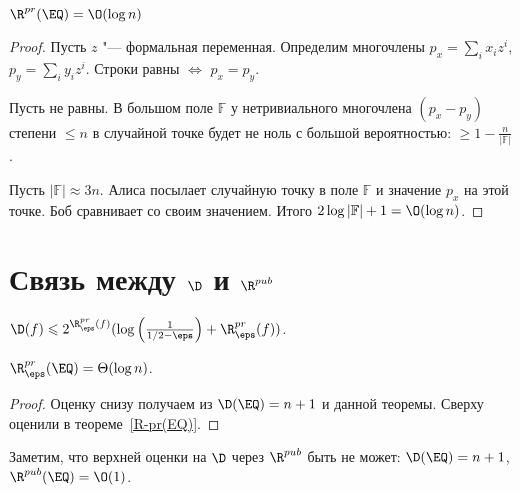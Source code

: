 \begin{theorem}
\label{R-pr(EQ)}
$\R^{pr}(\EQ) = \O(\log n)$
\end{theorem}
\begin{proof}
Пусть $z$ "--- формальная переменная.
Определим многочлены $p_x = \sum_i x_i z^i$, $p_y = \sum_i y_i z^i$. Строки равны $\iff$ $p_x = p_y$.

Пусть не равны. В большом поле $\mathbb{F}$ у нетривиального многочлена $(p_x-p_y)$ степени $\leqslant n$ в случайной точке будет не ноль с большой вероятностью: $\ge 1-\frac{n}{|\mathbb{F}|}$.

Пусть $|\mathbb{F}| \approx 3n$. Алиса посылает случайную точку в поле $\mathbb{F}$ и значение $p_x$ на этой точке. Боб сравнивает со своим значением. Итого $2\log |\mathbb{F}| + 1 = \O(\log n)$.
\end{proof}

\section{Связь между \texorpdfstring{$\D$}{D} и \texorpdfstring{$\R^{pub}$}{R[pub]}}
\begin{theorem}
$\D(f)\leqslant 2^{\R^{pr}_{\eps}(f)} (\log\left(\frac{1}{1/2-\eps}\right) + \R^{pr}_\eps(f))$.
\end{theorem}
\begin{corollary}
$\R^{pr}_\eps(\EQ) = \Theta(\log n)$.
\end{corollary}
\begin{proof}
Оценку снизу получаем из $\D(\EQ) = n + 1$ и данной теоремы.
Сверху оценили в теореме~\ref{R-pr(EQ)}.
\end{proof}

Заметим, что верхней оценки на $\D$ через $\R^{pub}$ быть не может: $\D(\EQ) = n + 1$, $\R^{pub}(\EQ) = \O(1)$.

